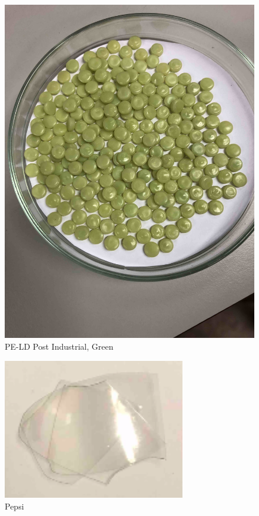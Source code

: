 \begin{appendices}
\begin{figure}
    \centering
    \includegraphics[width = 12cm]{Images/appendix/PE-Recyclate-(Post-Industrial)-lightgreen.jpg}
    \caption[$\; \:$PE-LD Post Industrial, Green]{PE-LD Post Industrial, Green}
    \label{fig:peld-green}
\end{figure}

\begin{figure}
    \centering
    \includegraphics[width = 8cm]{Images/appendix/pepsi.png}
    \caption[$\; \:$Pepsi]{Pepsi}
    \label{fig:pepsi}
\end{figure}


\end{appendices}
